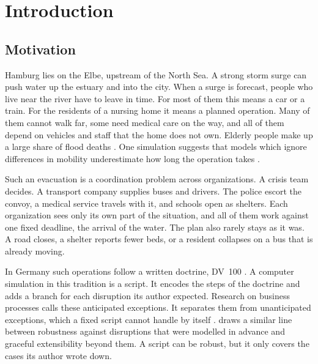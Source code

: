 \chapter{Introduction}
\label{ch:intro}

%
%

\section{Motivation}
\label{sec:intro:motivation}

Hamburg lies on the Elbe, upstream of the North Sea. A strong storm surge can
push water up the estuary and into the city. When a surge is forecast, people
who live near the river have to leave in time. For most of them this means a
car or a train. For the residents of a nursing home it means a planned
operation. Many of them cannot walk far, some need medical care on the way, and
all of them depend on vehicles and staff that the home does not own. Elderly people
make up a large share of flood deaths \parencite{yin2024}. One simulation
suggests that models which ignore differences in mobility underestimate how
long the operation takes \parencite{alqahtani2025a}.

Such an evacuation is a coordination problem across organizations. A crisis
team decides. A transport company supplies buses and drivers. The police escort
the convoy, a medical service travels with it, and schools open as shelters.
Each organization sees only its own part of the situation, and all of them work
against one fixed deadline, the arrival of the water. The plan also rarely stays
as it was. A road closes, a shelter reports fewer beds, or a resident collapses
on a bus that is already moving.

In Germany such operations follow a written doctrine, DV~100
\parencite{fwdv100}. A computer simulation in this tradition is a script. It
encodes the steps of the doctrine and adds a branch for each disruption its
author expected. Research on business processes calls these anticipated
exceptions. It separates them from unanticipated exceptions, which a fixed
script cannot handle by itself \parencite{reichert2012}. \textcite{woods2015a}
draws a similar line between robustness against disruptions that were modelled
in advance and graceful extensibility beyond them. A script can be robust, but
it only covers the cases its author wrote down.

